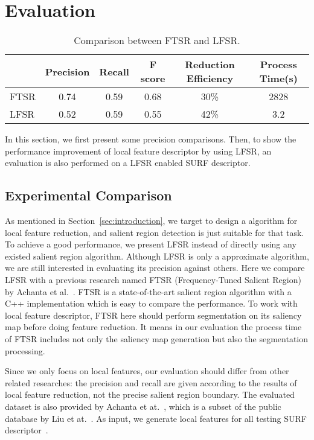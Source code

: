\section{Evaluation}
\label{sec:evaluation}

\begin{table*}[!t]
\label{tab:comparison}
\begin{center}
\begin{tabular}{|l|c|c|c|c|c|}
\hline
 & Precision & Recall & F score & Reduction Efficiency & Process Time(s) \\
\hline\hline
FTSR & 0.74 & 0.59 & 0.68 & 30\% & 2828 \\
LFSR & 0.52 & 0.59 & 0.55 & 42\% & 3.2 \\
\hline
\end{tabular}
\end{center}
\caption{Comparison between FTSR and LFSR.}
\end{table*}

In this section, we first present some precision comparisons. Then, to show the performance improvement of local feature descriptor by using LFSR, an evaluation is also performed on a LFSR enabled SURF descriptor.

\subsection{Experimental Comparison}
\label{sec:evaluation_comparison}

As mentioned in Section~\ref{sec:introduction}, we target to design a algorithm for local feature reduction, and salient region detection is just suitable for that task. To achieve a good performance, we present LFSR instead of directly using any existed salient region algorithm. Although LFSR is only a approximate algorithm, we are still interested in evaluating its precision against others. Here we compare LFSR with a previous research named FTSR (Frequency-Tuned Salient Region) by Achanta et al.~\cite{achanta2009frequency}. FTSR is a state-of-the-art salient region algorithm with a C++ implementation which is easy to compare the performance. To work with local feature descriptor, FTSR here should perform segmentation on its saliency map before doing feature reduction. It means in our evaluation the process time of FTSR includes not only the saliency map generation but also the segmentation processing.

Since we only focus on local features, our evaluation should differ from other related researches: the precision and recall are given according to the results of local feature reduction, not the precise salient region boundary. The evaluated dataset is also provided by Achanta et at.~\cite{achanta2009frequency}, which is a subset of the public database by Liu et at.~\cite{liu2011learning}. As input, we generate local features for all testing SURF descriptor~\cite{evans2010opensurf}. 

